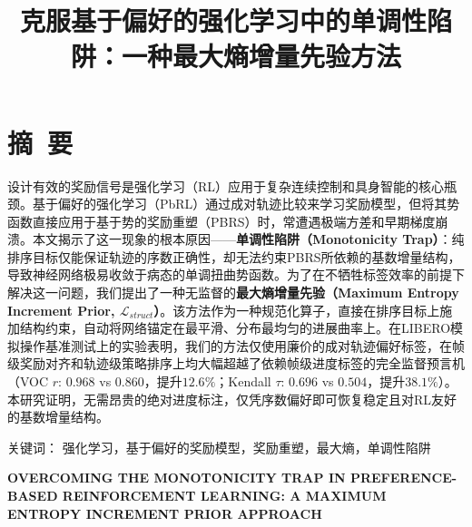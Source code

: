 

\renewcommand{\mytitle}{克服基于偏好的强化学习中的单调性陷阱：一种最大熵增量先验方法}
\renewcommand{\mytitleEN}{OVERCOMING THE MONOTONICITY TRAP IN PREFERENCE-BASED REINFORCEMENT LEARNING: A MAXIMUM ENTROPY INCREMENT PRIOR APPROACH}


\setlength{\baselineskip}{20pt}

\title{\hei{}\bfseries\mytitle}
\maketitle
\thispagestyle{empty}
\clearpage



{\pagestyle{plain}
\tableofcontents
\clearpage}


\section*{摘~要}
设计有效的奖励信号是强化学习（RL）应用于复杂连续控制和具身智能的核心瓶颈。基于偏好的强化学习（PbRL）通过成对轨迹比较来学习奖励模型，但将其势函数直接应用于基于势的奖励重塑（PBRS）时，常遭遇极端方差和早期梯度崩溃。本文揭示了这一现象的根本原因——\textbf{单调性陷阱（Monotonicity Trap）}：纯排序目标仅能保证轨迹的序数正确性，却无法约束PBRS所依赖的基数增量结构，导致神经网络极易收敛于病态的单调扭曲势函数。为了在不牺牲标签效率的前提下解决这一问题，我们提出了一种无监督的\textbf{最大熵增量先验（Maximum Entropy Increment Prior, $\mathcal{L}_{struct}$）}。该方法作为一种规范化算子，直接在排序目标上施加结构约束，自动将网络锚定在最平滑、分布最均匀的进展曲率上。在LIBERO模拟操作基准测试上的实验表明，我们的方法仅使用廉价的成对轨迹偏好标签，在帧级奖励对齐和轨迹级策略排序上均大幅超越了依赖帧级进度标签的完全监督预言机（VOC $r$: $0.968$ vs $0.860$，提升$12.6\%$；Kendall $\tau$: $0.696$ vs $0.504$，提升$38.1\%$）。本研究证明，无需昂贵的绝对进度标注，仅凭序数偏好即可恢复稳定且对RL友好的基数增量结构。

\vspace{1em}\noindent
{\hei 关键词：}
{\song 强化学习，基于偏好的奖励模型，奖励重塑，最大熵，单调性陷阱}
\clearpage



{\centering{}\bfseries\sffamily \mytitleEN\par}
\vspace{1em}
